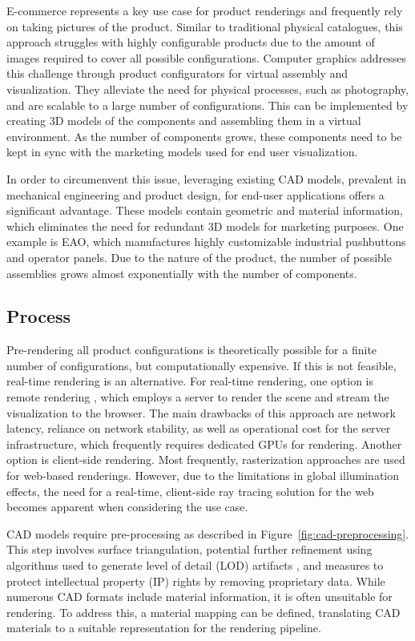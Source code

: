 E-commerce represents a key use case for product renderings and frequently rely on taking pictures of the product. Similar to traditional physical catalogues, this approach struggles with highly configurable products due to the amount of images required to cover all possible configurations. Computer graphics addresses this challenge through product configurators for virtual assembly and visualization. They alleviate the need for physical processes, such as photography, and are scalable to a large number of configurations. This can be implemented by creating 3D models of the components and assembling them in a virtual environment. As the number of components grows, these components need to be kept in sync with the marketing models used for end user visualization.

In order to circumenvent this issue, leveraging existing CAD models, prevalent in mechanical engineering and product design, for end-user applications offers a significant advantage. These models contain geometric and material information, which eliminates the need for redundant 3D models for marketing purposes. One example is EAO, which manufactures highly customizable industrial pushbuttons and operator panels. Due to the nature of the product, the number of possible assemblies grows almost exponentially with the number of components.

\subsection{Process}

Pre-rendering all product configurations is theoretically possible for a finite number of configurations, but computationally expensive. If this is not feasible, real-time rendering is an alternative. For real-time rendering, one option is remote rendering \cite{remoteRendering}, which employs a server to render the scene and stream the visualization to the browser. The main drawbacks of this approach are network latency, reliance on network stability, as well as operational cost for the server infrastructure, which frequently requires dedicated GPUs for rendering. Another option is client-side rendering. Most frequently, rasterization approaches are used for web-based renderings. However, due to the limitations in global illumination effects, the need for a real-time, client-side ray tracing solution for the web becomes apparent when considering the use case.

CAD models require pre-processing as described in Figure~\ref{fig:cad-preprocessing}. This step involves surface triangulation, potential further refinement using algorithms used to generate level of detail (LOD) artifacts \cite{luebke2003level}, and measures to protect intellectual property (IP) rights by removing proprietary data. While numerous CAD formats include material information, it is often unsuitable for rendering. To address this, a material mapping can be defined, translating CAD materials to a suitable representation for the rendering pipeline.

